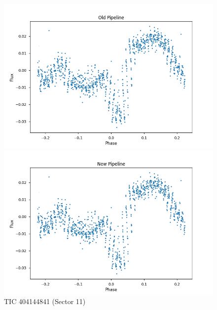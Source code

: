 \documentclass{article}
\begin{document}
\begin{figure}[h!]
    \centering
    \begin{minipage}{0.45\textwidth}
        \centering
        \includegraphics[width=\textwidth]{./figures/9_old.png}
    \end{minipage}%
    \hfill
    \begin{minipage}{0.45\textwidth}
        \centering
        \includegraphics[width=\textwidth]{./figures/9_new.png}
    \end{minipage}
    \caption{TIC 404144841 (Sector 11)}
\end{figure}
\end{document}
